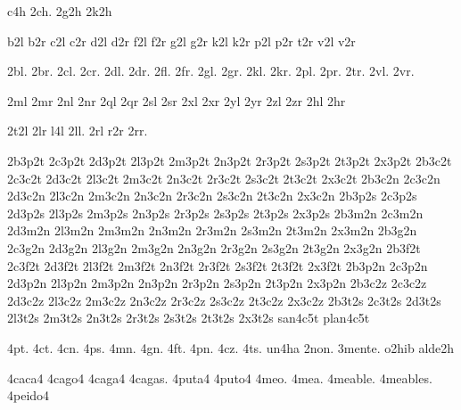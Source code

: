 {{c4h 2ch. 2g2h 2k2h 

b2l b2r 
c2l c2r 
d2l d2r 
f2l f2r 
g2l g2r 
k2l k2r 
p2l p2r 
    t2r 
v2l v2r 

2bl. 2br. 
2cl. 2cr. 
2dl. 2dr. 
2fl. 2fr. 
2gl. 2gr. 
2kl. 2kr. 
2pl. 2pr. 
     2tr. 
2vl. 2vr. 

2ml 2mr 
2nl 2nr 
2ql 2qr 
2sl 2sr 
2xl 2xr 
2yl 2yr 
2zl 2zr 
2hl 2hr 

2t2l 
2lr l4l 2ll. 2rl r2r 2rr. 

2b3p2t 2c3p2t 2d3p2t 2l3p2t 2m3p2t 2n3p2t 2r3p2t 2s3p2t 2t3p2t 2x3p2t 
2b3c2t 2c3c2t 2d3c2t 2l3c2t 2m3c2t 2n3c2t 2r3c2t 2s3c2t 2t3c2t 2x3c2t 
2b3c2n 2c3c2n 2d3c2n 2l3c2n 2m3c2n 2n3c2n 2r3c2n 2s3c2n 2t3c2n 2x3c2n 
2b3p2s 2c3p2s 2d3p2s 2l3p2s 2m3p2s 2n3p2s 2r3p2s 2s3p2s 2t3p2s 2x3p2s 
2b3m2n 2c3m2n 2d3m2n 2l3m2n 2m3m2n 2n3m2n 2r3m2n 2s3m2n 2t3m2n 2x3m2n 
2b3g2n 2c3g2n 2d3g2n 2l3g2n 2m3g2n 2n3g2n 2r3g2n 2s3g2n 2t3g2n 2x3g2n 
2b3f2t 2c3f2t 2d3f2t 2l3f2t 2m3f2t 2n3f2t 2r3f2t 2s3f2t 2t3f2t 2x3f2t 
2b3p2n 2c3p2n 2d3p2n 2l3p2n 2m3p2n 2n3p2n 2r3p2n 2s3p2n 2t3p2n 2x3p2n 
2b3c2z 2c3c2z 2d3c2z 2l3c2z 2m3c2z 2n3c2z 2r3c2z 2s3c2z 2t3c2z 2x3c2z 
2b3t2s 2c3t2s 2d3t2s 2l3t2s 2m3t2s 2n3t2s 2r3t2s 2s3t2s 2t3t2s 2x3t2s 
san4c5t plan4c5t 

4pt. 4ct. 4cn. 4ps. 4mn. 4gn. 4ft. 4pn. 4cz. 4ts. 
un4ha 2non. 3mente. o2hib alde2h 

4caca4 4cago4 4caga4 4cagas. 4puta4 4puto4 4meo. 4mea. 
4meable. 4meables. 4peido4 

}}
